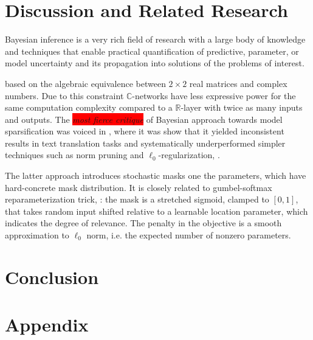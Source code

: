 \documentclass[a4paper,10pt]{article}
\newcommand{\real}{\mathbb{R}}
\newcommand{\cplx}{\mathbb{C}}
\newcommand{\verify}[1]{\textit{\!\colorbox{red}{#1}\!}}
\begin{document}



\section{Discussion and Related Research} %
\label{sec:discussion_and_related_research}

Bayesian inference is a very rich field of research with a large body of knowledge and techniques
that enable practical quantification of predictive, parameter, or model uncertainty and its
propagation into solutions of the problems of interest.

based on the algebraic equivalence between $2 \times 2$ real matrices and complex numbers.
Due to this constraint $\cplx$-networks have less expressive power for the same computation
complexity compared to a $\real$-layer with twice as many inputs and outputs.
%
The \verify{most fierce critique} of Bayesian approach towards model
sparsification was voiced in \citep{gale_state_2019}, where it was show that it yielded
inconsistent results in text translation tasks and systematically underperformed simpler
techniques such as norm pruning and $\ell_0$-regularization, \citep{louizos_learning_2017}.

The latter approach introduces stochastic masks one the parameters, which have hard-concrete
mask distribution. It is closely related to gumbel-softmax reparameterization trick,
\citep{kingma_auto-encoding_2014,jang_categorical_2017}: the mask is a stretched sigmoid,
clamped to $[0,1]$, that takes random input shifted relative to a learnable location
parameter, which indicates the degree of relevance. The penalty in the objective is a
smooth approximation to $\ell_0$ norm, i.e. the expected number of nonzero parameters.



\section{Conclusion} %
\label{sec:conclusion}


\clearpage




\clearpage

\section{Appendix} %
\label{sec:appendix}
\end{document}
